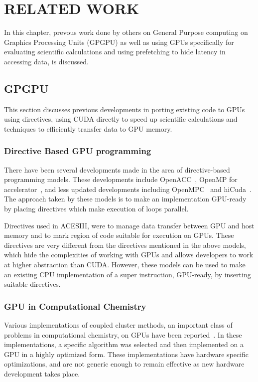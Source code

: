 \chapter{RELATED WORK}\label{lit}
In this chapter, prevous work done by others on General Purpose computing on Graphics Processing
Units (GPGPU) as well as using GPUs specifically for evaluating scientific calculations
and using prefetching to hide latency in accessing data, is discussed.

\section{GPGPU}
This section discusses previous developments in porting existing
code to GPUs using directives, using CUDA directly to speed up scientific calculations and
techniques to efficiently transfer data to GPU memory.

\subsection{Directive Based GPU programming}
There have been several developments made in the area of directive-based programming models. These
developments include OpenACC~\cite{openacc}, OpenMP for
accelerator~\cite{openmpforaccelerators}, and less updated developments including
OpenMPC~\cite{openmpc} and hiCuda~\cite{hicuda}. The approach taken by these models
is to make an implementation GPU-ready by placing directives which make
execution of loops parallel.

Directives used in ACESIII, were to manage
data transfer between GPU and host memory and to mark region of code suitable for
execution on GPUs. These directives are very different from the directives mentioned
in the above models, which hide the complexities of working with GPUs and allows
developers to work at higher abstraction than CUDA.
However, these models can be used to make an existing CPU implementation
of a super instruction, GPU-ready, by inserting suitable directives.

\subsection{GPU in Computational Chemistry}
Various implementations of coupled cluster methods, an important class of problems
in computational chemistry,
on GPUs have been reported~\cite{bhaskar2013, deprince2011, maw2011}. In these
implementations, a specific algorithm was selected and then implemented on a
GPU in a highly optimized form. These implementations have hardware specific
optimizations, and are not generic enough to remain effective as new hardware
development takes place.

